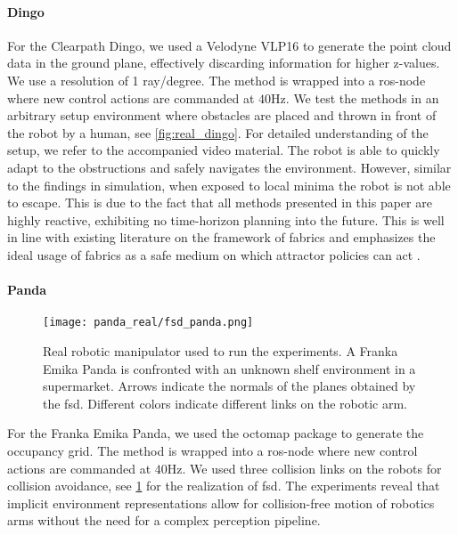 \paragraph{Dingo}
For the Clearpath Dingo, we used a Velodyne
VLP16 to generate the point cloud data in the ground plane,
effectively discarding information for higher z-values. We
use a resolution of 1 ray/degree. The method is wrapped into
a ros-node where new control actions are commanded at
$40$Hz. We test the methods in an
arbitrary setup environment where obstacles are placed and
thrown in front of the robot by a human, see
\cref{fig:real_dingo}. For detailed understanding of
the setup, we refer to the accompanied video material. The
robot is able to quickly adapt to the obstructions and
safely navigates the environment. However, similar to the
findings in simulation, when exposed to local minima the
robot is not able to escape. This is due to the fact that
all methods presented in this paper are highly reactive, exhibiting
no time-horizon planning into the future. This is well in line with
existing literature on the framework of \ac{fabrics} and
emphasizes the ideal usage of \ac{fabrics} as a safe
medium on which attractor policies can act \cite{wyk2024geometric}.

\paragraph{Panda}
%
\begin{figure}[ht]
  \texttt{[image: panda\_real/fsd\_panda.png]}
  \caption{Real robotic manipulator used to run the experiments. A
    Franka Emika Panda is confronted with an unknown shelf
    environment in a supermarket. Arrows indicate the
    normals of the planes obtained by the \ac{fsd}.
    Different colors indicate different links on the robotic
    arm.
  }
  \label{fig:real_panda}
\end{figure}
%
For the Franka Emika Panda, we used the octomap package to
generate the occupancy grid. The method is wrapped into a
ros-node where new control actions are commanded at $40$Hz.
We used three collision links on the robots for collision
avoidance, see \cref{fig:real_panda} for the realization of
\ac{fsd}. The experiments reveal that implicit environment
representations allow for collision-free motion of robotics
arms without the need for a complex perception pipeline.

